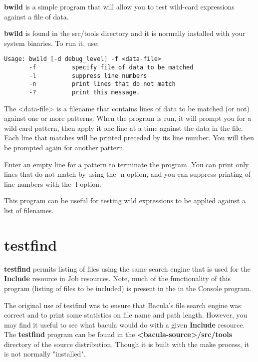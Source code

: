 {\bf bwild} is a simple program that will allow you to test
wild-card expressions against a file of data.

{\bf bwild} is found in the src/tools directory and it is
normally installed with your system binaries. To run it, use:

\begin{verbatim}
Usage: bwild [-d debug_level] -f <data-file>
       -f          specify file of data to be matched
       -l          suppress line numbers
       -n          print lines that do not match
       -?          print this message.
\end{verbatim}

The {\textless}data-file{\textgreater} is a filename that contains lines
of data to be matched (or not) against one or more patterns.
When the program is run, it will prompt you for a wild-card
pattern, then apply it one line at a time against
the data in the file. Each line that matches will be printed
preceded by its line number.  You will then be prompted again
for another pattern.

Enter an empty line for a pattern to terminate the program. You
can print only lines that do not match by using the -n option,
and you can suppress printing of line numbers with the -l option.

This program can be useful for testing wild expressions to be
applied against a list of filenames.

\section{testfind}
\label{testfind}

{\bf testfind} permits listing of files using the same search engine that is
used for the {\bf Include} resource in Job resources. Note, much of the
functionality of this program (listing of files to be included) is present in
the
 in the Console program.

The original use of testfind was to ensure that Bacula's file search engine
was correct and to print some statistics on file name and path length.
However, you may find it useful to see what bacula would do with a given {\bf
Include} resource. The {\bf testfind} program can be found in the {\bf
{\textless}bacula-source{\textgreater}/src/tools} directory of the source distribution.
Though it is built with the make process, it is not normally "installed".

